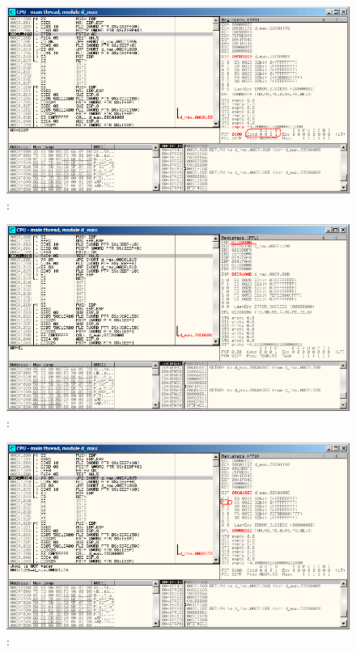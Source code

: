 \begin{figure}[H]
\centering
\includegraphics[scale=\FigScale]{patterns/12_FPU/3_comparison/x86/MSVC/olly2_2.png}
\caption{\olly: \FCOMP {}}
\label{fig:FPU_comparison_case2_olly2}
\end{figure}

\begin{figure}[H]
\centering
\includegraphics[scale=\FigScale]{patterns/12_FPU/3_comparison/x86/MSVC/olly2_3.png}
\caption{\olly: \FNSTSW {}}
\label{fig:FPU_comparison_case2_olly3}
\end{figure}

\begin{figure}[H]
\centering
\includegraphics[scale=\FigScale]{patterns/12_FPU/3_comparison/x86/MSVC/olly2_4.png}
\caption{\olly: \TEST {}}
\label{fig:FPU_comparison_case2_olly4}
\end{figure}

